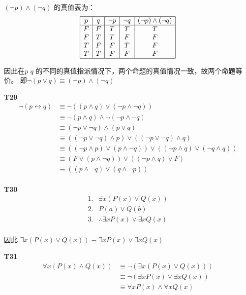 \documentclass{article}
\begin{document}
$(\lnot p) \land (\lnot q)$ 的真值表为：
\[
\begin{array}{|c|c|c|c|c|}
    \hline
    p & q & \lnot p & \lnot q & (\lnot p) \land (\lnot q)\\
    \hline
    F & F & T & T & T\\
    F & T & T & F & F\\
    T & F & F & T & F\\
    T & T & F & F & F\\
    \hline
\end{array}
\]

因此在$\textit{p q}$ 的不同的真值指派情况下，两个命题的真值情况一致，故两个命题等价。
即$\lnot (p \lor q) \equiv (\lnot p) \land (\lnot q)$

\vspace{10pt}

\textbf{T29}
\begin{align*}
    \lnot (p \leftrightarrow q) &\equiv \lnot ((p \land q) \lor (\lnot p \land \lnot q))\\
    &\equiv \lnot (p \land q) \land \lnot (\lnot p \land \lnot q)\\
    &\equiv (\lnot p \lor \lnot q) \land (p \lor q)\\
    &\equiv ((\lnot p \lor \lnot q) \land p) \lor ((\lnot p \lor \lnot q) \land q)\\
    &\equiv ((\lnot p \land p) \lor (p \land \lnot q)) \lor ((\lnot p \land q) \lor (\lnot q \land q))\\
    &\equiv (F \lor (p \land \lnot q)) \lor ((\lnot p \land q) \lor F)\\
    &\equiv ((p \land \lnot q) \lor (q \land \lnot p))\\
\end{align*}

\vspace{10pt}

\textbf{T30}
\[
\begin{array}{cc}
    1. & \exists x (P(x) \lor Q(x))\\
    2. & P(a) \lor Q(b)\\
    \hline
    3. & \therefore \exists x P(x) \lor \exists x Q(x)\\
\end{array}
\]

因此 $\exists x (P(x) \lor Q(x)) \equiv \exists x P(x) \lor \exists x Q(x)$

\vspace{10pt}

\textbf{T31}
\begin{align*}
\forall x (P(x) \land Q(x)) &\equiv \lnot (\exists x (P(x) \lor Q(x)))\\
&\equiv \lnot (\exists x P(x) \lor \exists x Q(x))\\
&\equiv \forall x P(x) \land \forall x Q(x)\\    
\end{align*}
\end{document}
